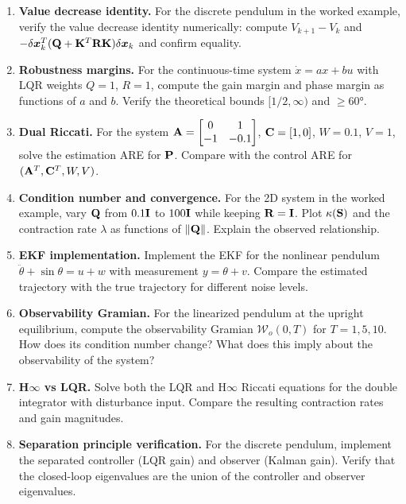 \begin{enumerate}
\item \textbf{Value decrease identity.}
      For the discrete pendulum in the worked example, verify the value decrease identity
      numerically: compute $V_{k+1} - V_k$ and $-\delta\bm{x}_k^T(\mathbf{Q} + \mathbf{K}^T\mathbf{R}\mathbf{K})\delta\bm{x}_k$
      and confirm equality.

\item \textbf{Robustness margins.}
      For the continuous-time system $\dot{x} = ax + bu$ with LQR weights $Q = 1$, $R = 1$,
      compute the gain margin and phase margin as functions of $a$ and $b$. Verify the
      theoretical bounds $[1/2, \infty)$ and $\geq 60°$.

\item \textbf{Dual Riccati.}
      For the system $\mathbf{A} = \begin{bmatrix} 0 & 1 \\ -1 & -0.1 \end{bmatrix}$,
      $\mathbf{C} = [1, 0]$, $W = 0.1$, $V = 1$, solve the estimation ARE for $\mathbf{P}$.
      Compare with the control ARE for $(\mathbf{A}^T, \mathbf{C}^T, W, V)$.

\item \textbf{Condition number and convergence.}
      For the 2D system in the worked example, vary $\mathbf{Q}$ from $0.1\mathbf{I}$ to $100\mathbf{I}$
      while keeping $\mathbf{R} = \mathbf{I}$. Plot $\kappa(\mathbf{S})$ and the contraction rate
      $\lambda$ as functions of $\|\mathbf{Q}\|$. Explain the observed relationship.

\item \textbf{EKF implementation.}
      Implement the EKF for the nonlinear pendulum $\ddot\theta + \sin\theta = u + w$
      with measurement $y = \theta + v$. Compare the estimated trajectory with the true
      trajectory for different noise levels.

\item \textbf{Observability Gramian.}
      For the linearized pendulum at the upright equilibrium, compute the observability
      Gramian $\mathcal{W}_o(0, T)$ for $T = 1, 5, 10$. How does its condition number
      change? What does this imply about the observability of the system?

\item \textbf{H$\infty$ vs LQR.}
      Solve both the LQR and H$\infty$ Riccati equations for the double integrator with
      disturbance input. Compare the resulting contraction rates and gain magnitudes.

\item \textbf{Separation principle verification.}
      For the discrete pendulum, implement the separated controller (LQR gain) and
      observer (Kalman gain). Verify that the closed-loop eigenvalues are the union
      of the controller and observer eigenvalues.
\end{enumerate}
